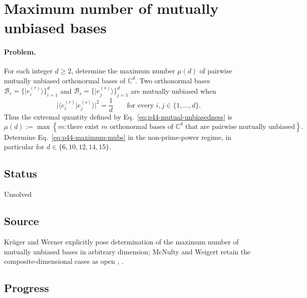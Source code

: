 \section{Maximum number of mutually unbiased bases}
\label{sec:op_c9c62042b15fcb06}

\paragraph{Problem.}
For each integer $d\geq2$, determine the maximum number $\mu(d)$ of pairwise
mutually unbiased orthonormal bases of $\mathbb C^d$.  Two orthonormal bases
$\mathcal B_r=\{|e_i^{(r)}\rangle\}_{i=1}^{d}$ and
$\mathcal B_s=\{|e_j^{(s)}\rangle\}_{j=1}^{d}$ are mutually unbiased when
\begin{equation}
  \bigl|\langle e_i^{(r)}|e_j^{(s)}\rangle\bigr|^2=\frac1d
  \qquad\text{for every }i,j\in\{1,\ldots,d\}.
  \label{eq:p44-mutual-unbiasedness}
\end{equation}
Thus the extremal quantity defined by Eq.~\eqref{eq:p44-mutual-unbiasedness}
is
\begin{equation}
  \mu(d):=\max\left\{m:\text{there exist $m$ orthonormal bases of
  $\mathbb C^d$ that are pairwise mutually unbiased}\right\}.
  \label{eq:p44-maximum-mubs}
\end{equation}
Determine Eq.~\eqref{eq:p44-maximum-mubs} in the non-prime-power regime, in
particular for $d\in\{6,10,12,14,15\}$.

\subsection*{Status}

Unsolved

\subsection*{Source}

Kr\"uger and Werner explicitly pose determination of the maximum number of
mutually unbiased bases in arbitrary dimension; McNulty and Weigert retain
the composite-dimensional cases as open
,
.

\subsection*{Progress}

